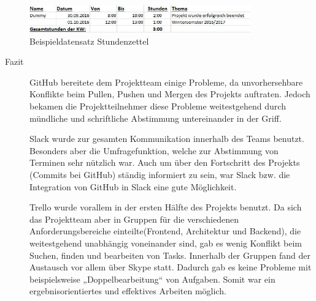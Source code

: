 \begin{figure}[!h]
    \centering
    \includegraphics[width=0.85\textwidth]{Graphics/stundenzettel}
    \caption{Beispieldatensatz Stundenzettel}
   \label{fig:stundenzettel}
\end{figure}
 
\begin{description}	
\item [Fazit] GitHub bereitete dem Projektteam einige Probleme, da unvorhersehbare Konflikte beim Pullen, Pushen und Mergen des Projekts auftraten. Jedoch bekamen die Projektteilnehmer diese Probleme weitestgehend durch mündliche und schriftliche Abstimmung untereinander in der Griff. 

Slack wurde zur gesamten Kommunikation innerhalb des Teams benutzt. Besonders aber die Umfragefunktion, welche zur Abstimmung von Terminen sehr nützlich war. Auch um über den Fortschritt des Projekts (Commits bei GitHub) ständig informiert zu sein, war Slack bzw. die Integration von GitHub in Slack eine gute Möglichkeit. 

Trello wurde vorallem in der ersten Hälfte des Projekts benutzt. Da sich das Projektteam aber in  Gruppen für die verschiedenen Anforderungsbereiche einteilte(Frontend, Architektur und Backend), die weitestgehend unabhängig voneinander sind, gab es wenig Konflikt beim Suchen, finden und bearbeiten von Tasks. Innerhalb der Gruppen fand der Austausch vor allem über Skype statt. Dadurch gab es keine Probleme mit beispielsweise „Doppelbearbeitung“ von Aufgaben. Somit war ein ergebnisorientiertes und effektives Arbeiten möglich. 
\end{description}

